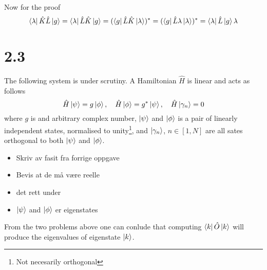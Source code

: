 \documentclass{article}
\begin{document}
Now for the proof
\begin{equation}
\bra{\lambda}\hat{K}\hat{L}\ket{g}=\bra{\lambda}\hat{L}\hat{K}\ket{g}=
(\bra{g}\hat{L}\hat{K}\ket{\lambda})^*=(\bra{g}\hat{L}\lambda\ket{\lambda})^*=\bra{\lambda}\hat{L}\ket{g}\lambda
\end{equation}

\section*{2.3}

The following system is under scrutiny. A Hamiltonian $\hat{H}$ is linear and acts as follows
\begin{equation*}
\hat{H}\ket{\psi}=g\ket{\phi}, \quad \hat{H}\ket{\phi}=g^*\ket{\psi}, \quad \hat{H}\ket{\gamma_n}=0
\end{equation*}
where $g$ is and arbitrary complex number, $\ket{\psi}$ and $\ket{\phi}$ is a pair of linearly independent states, normalised to unity\footnote{Not necesarily orthogonal}, and $\ket{\gamma_n}$, $n\in[1,N]$ are all sates orthogonal to both $\ket{\psi}$ and $\ket{\phi}$.

\begin{itemize}
\item Skriv av fasit fra forrige oppgave
\item Bevis at de må være reelle
\item det rett under
\item $\ket{\psi}$ and $\ket{\phi}$ er eigenstates
\end{itemize}

From the two problems above one can conlude that computing $\bra{k}\hat{O}\ket{k}$ will produce the eigenvalues of eigenstate $\ket{k}$.
\end{document}
